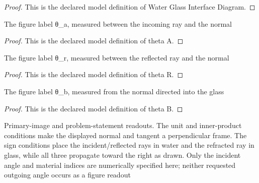 \begin{proof}
  This is the declared model definition of Water Glass Interface Diagram.
\end{proof}
\begin{definition}[theta A]
  \label{def:physics:phyx-mini-0036:phyxminiproblems-problemphyxmini0036-thetaa}
  The figure label θ\_a, measured between the incoming ray and the normal
\end{definition}
\begin{proof}
  This is the declared model definition of theta A.
\end{proof}
\begin{definition}[theta R]
  \label{def:physics:phyx-mini-0036:phyxminiproblems-problemphyxmini0036-thetar}
  The figure label θ\_r, measured between the reflected ray and the normal
\end{definition}
\begin{proof}
  This is the declared model definition of theta R.
\end{proof}
\begin{definition}[theta B]
  \label{def:physics:phyx-mini-0036:phyxminiproblems-problemphyxmini0036-thetab}
  The figure label θ\_b, measured from the normal directed into the glass
\end{definition}
\begin{proof}
  This is the declared model definition of theta B.
\end{proof}
\begin{definition}
  \label{def:physics:phyx-mini-0036:phyxminiproblems-problemphyxmini0036-matcheswaterglassfigure}
  Primary-image and problem-statement readouts. The unit and inner-product conditions make the displayed normal and tangent a perpendicular frame. The sign conditions place the incident/reflected rays in water and the refracted ray in glass, while all three propagate toward the right as drawn. Only the incident angle and material indices are numerically specified here; neither requested outgoing angle occurs as a figure readout
\end{definition}
